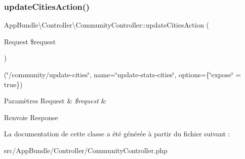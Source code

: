 \subsubsection{\texorpdfstring{update\+Cities\+Action()}{updateCitiesAction()}}
{\footnotesize\ttfamily App\+Bundle\textbackslash{}\+Controller\textbackslash{}\+Community\+Controller\+::update\+Cities\+Action (\begin{DoxyParamCaption}\item[{Request}]{\$request }\end{DoxyParamCaption})}

(\char`\"{}/community/update-\/cities\char`\"{}, name=\char`\"{}update-\/stats-\/cities\char`\"{}, options=\{\char`\"{}expose\char`\"{} = true\}) 
\begin{DoxyParams}[1]{Paramètres}
Request & {\em \$request} & \\
\hline
\end{DoxyParams}
\begin{DoxyReturn}{Renvoie}
Response 
\end{DoxyReturn}


La documentation de cette classe a été générée à partir du fichier suivant \+:\begin{DoxyCompactItemize}
\item 
src/\+App\+Bundle/\+Controller/Community\+Controller.\+php\end{DoxyCompactItemize}

